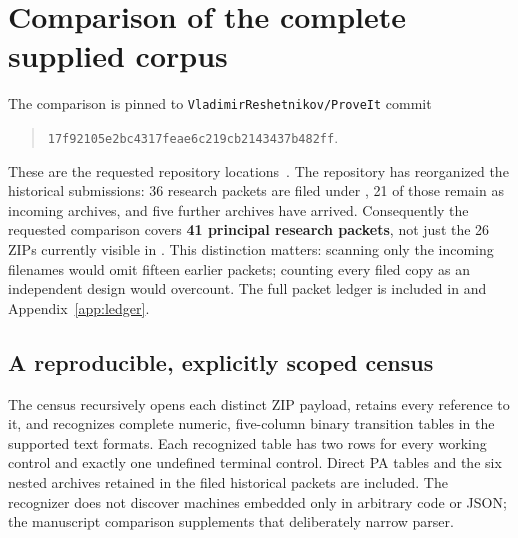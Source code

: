 \section{Comparison of the complete supplied corpus}
\label{sec:comparison}
The comparison is pinned to \texttt{VladimirReshetnikov/ProveIt} commit
\begin{quote}\small\nolinkurl{17f92105e2bc4317feae6c219cb2143437b482ff}.\end{quote}
These are the requested repository locations~\cite{repo,incoming}. The repository has reorganized the historical submissions: 36 research
packets are filed under ,
21 of those remain as incoming archives, and five further archives have
arrived. Consequently the requested comparison covers \textbf{41 principal
research packets}, not just the 26 ZIPs currently visible in
. This distinction matters: scanning only the incoming
filenames would omit fifteen earlier packets; counting every filed copy as
an independent design would overcount. The full packet ledger is included
in  and Appendix~\ref{app:ledger}.

\subsection{A reproducible, explicitly scoped census}
The census recursively opens each distinct ZIP payload, retains every
reference to it, and recognizes complete numeric, five-column binary
transition tables in the supported text formats. Each recognized table
has two rows for every working control and exactly one undefined terminal
control. Direct PA tables and the six nested archives retained in the
filed historical packets are included. The recognizer does not discover
machines embedded only in arbitrary code or JSON; the manuscript comparison
supplements that deliberately narrow parser.

